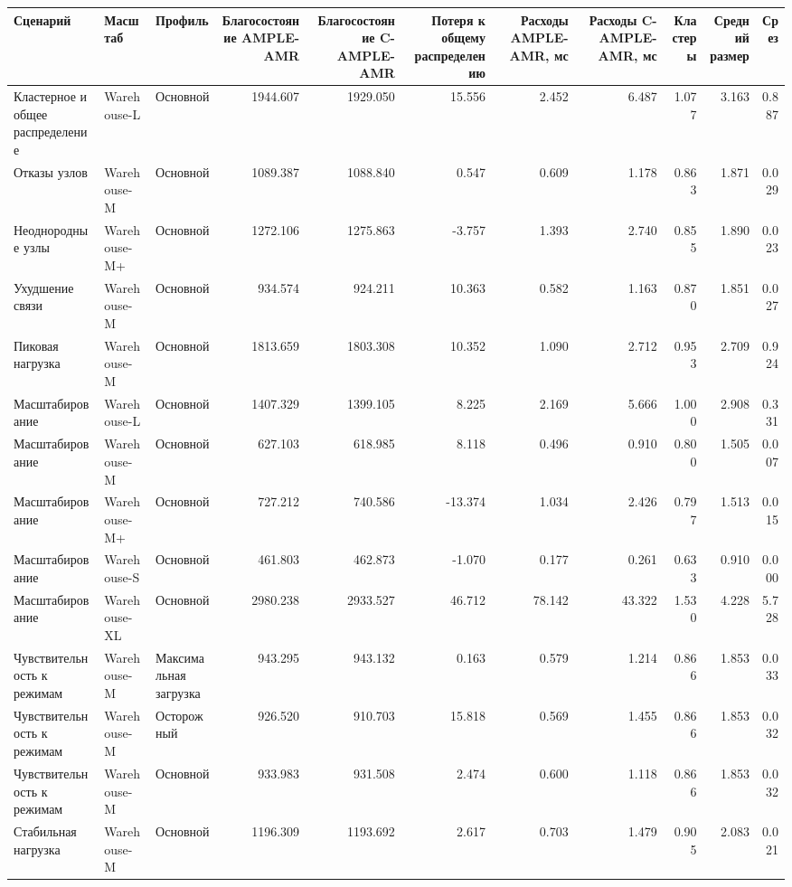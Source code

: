 \begin{tabular}{lllrrrrrrrr}
\toprule
 Сценарий & Масштаб & Профиль & Благосостояние AMPLE-AMR & Благосостояние C-AMPLE-AMR & Потеря к общему распределению & Расходы AMPLE-AMR, мс & Расходы C-AMPLE-AMR, мс & Кластеры & Средний размер & Срез \\
\midrule
 Кластерное и общее распределение & Warehouse-L & Основной & 1944.607 & 1929.050 & 15.556 & 2.452 & 6.487 & 1.077 & 3.163 & 0.887 \\
 Отказы узлов & Warehouse-M & Основной & 1089.387 & 1088.840 & 0.547 & 0.609 & 1.178 & 0.863 & 1.871 & 0.029 \\
 Неоднородные узлы & Warehouse-M+ & Основной & 1272.106 & 1275.863 & -3.757 & 1.393 & 2.740 & 0.855 & 1.890 & 0.023 \\
 Ухудшение связи & Warehouse-M & Основной & 934.574 & 924.211 & 10.363 & 0.582 & 1.163 & 0.870 & 1.851 & 0.027 \\
 Пиковая нагрузка & Warehouse-M & Основной & 1813.659 & 1803.308 & 10.352 & 1.090 & 2.712 & 0.953 & 2.709 & 0.924 \\
 Масштабирование & Warehouse-L & Основной & 1407.329 & 1399.105 & 8.225 & 2.169 & 5.666 & 1.000 & 2.908 & 0.331 \\
 Масштабирование & Warehouse-M & Основной & 627.103 & 618.985 & 8.118 & 0.496 & 0.910 & 0.800 & 1.505 & 0.007 \\
 Масштабирование & Warehouse-M+ & Основной & 727.212 & 740.586 & -13.374 & 1.034 & 2.426 & 0.797 & 1.513 & 0.015 \\
 Масштабирование & Warehouse-S & Основной & 461.803 & 462.873 & -1.070 & 0.177 & 0.261 & 0.633 & 0.910 & 0.000 \\
 Масштабирование & Warehouse-XL & Основной & 2980.238 & 2933.527 & 46.712 & 78.142 & 43.322 & 1.530 & 4.228 & 5.728 \\
 Чувствительность к режимам & Warehouse-M & Максимальная загрузка & 943.295 & 943.132 & 0.163 & 0.579 & 1.214 & 0.866 & 1.853 & 0.033 \\
 Чувствительность к режимам & Warehouse-M & Осторожный & 926.520 & 910.703 & 15.818 & 0.569 & 1.455 & 0.866 & 1.853 & 0.032 \\
 Чувствительность к режимам & Warehouse-M & Основной & 933.983 & 931.508 & 2.474 & 0.600 & 1.118 & 0.866 & 1.853 & 0.032 \\
 Стабильная нагрузка & Warehouse-M & Основной & 1196.309 & 1193.692 & 2.617 & 0.703 & 1.479 & 0.905 & 2.083 & 0.021 \\
\bottomrule
\end{tabular}
